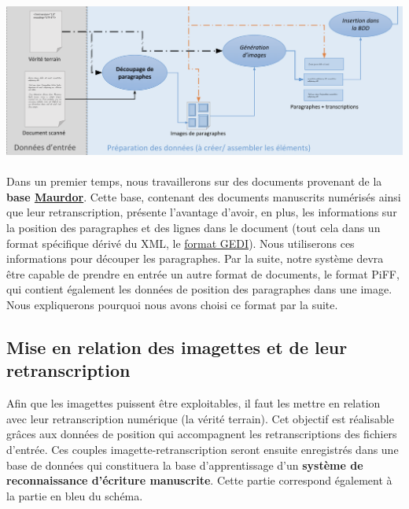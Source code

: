 \paragraph{}
\begin{mdframed}[frametitle={Partie traitement des données du projet (sans détection de lignes)}, innerbottommargin=10]
\begin{center}
\includegraphics[width=\linewidth]{sans-detection.png}
\end{center}
\end{mdframed}

\paragraph{}
Dans un premier temps, nous travaillerons sur des documents provenant de la \textbf{base
\href{http://www.maurdor-campaign.org/}{Maurdor}}. Cette base, contenant des documents manuscrits numérisés
ainsi que leur retranscription, présente l’avantage d’avoir, en plus, les informations sur la position des
paragraphes et des lignes dans le document (tout cela dans un format spécifique dérivé du XML, le
\href{https://lampsrv02.umiacs.umd.edu/projdb/project.php?id=53}{format GEDI}). Nous utiliserons ces informations
pour découper les paragraphes. Par la suite, notre système devra être capable de prendre en entrée un autre
format de documents, le format PiFF\cite{piff:2017}, qui contient également les données de position des
paragraphes dans une image. Nous expliquerons pourquoi nous avons choisi ce format par la suite.


\subsection{Mise en relation des imagettes et de leur retranscription}

Afin que les imagettes puissent être exploitables, il faut les mettre en relation avec leur retranscription
numérique (la vérité terrain). Cet objectif est réalisable grâces aux données de position qui accompagnent
les retranscriptions des fichiers d’entrée. Ces couples imagette-retranscription seront ensuite enregistrés
dans une base de données qui constituera la base d’apprentissage d’un \textbf{système de reconnaissance
d’écriture manuscrite}. Cette partie correspond également à la partie en bleu du schéma.

